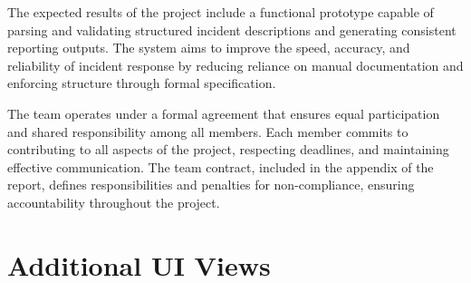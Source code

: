 The expected results of the project include a functional prototype capable of parsing and validating structured incident descriptions and generating consistent reporting outputs. The system aims to improve the speed, accuracy, and reliability of incident response by reducing reliance on manual documentation and enforcing structure through formal specification.

The team operates under a formal agreement that ensures equal participation and shared responsibility among all members. Each member commits to contributing to all aspects of the project, respecting deadlines, and maintaining effective communication. The team contract, included in the appendix of the report, defines responsibilities and penalties for non-compliance, ensuring accountability throughout the project.

\section{Additional UI Views}
\label{sec:appendix_ui_views}
